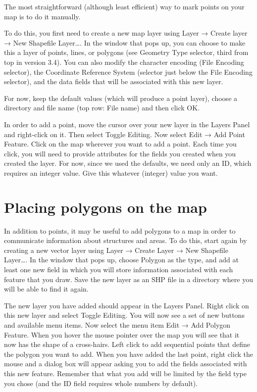 \documentclass[]{book}
\begin{document}
The most straightforward (although least efficient) way to mark points on your map is to do it manually.

To do this, you first need to create a new map layer using Layer → Create layer → New Shapefile Layer\ldots{}. In the window that pops up, you can choose to make this a layer of points, lines, or polygons (see Geometry Type selector, third from top in version 3.4). You can also modify the character encoding (File Encoding selector), the Coordinate Reference System (selector just below the File Encoding selector), and the data fields that will be associated with this new layer.

For now, keep the default values (which will produce a point layer), choose a directory and file name (top row: File name) and then click OK.

In order to add a point, move the cursor over your new layer in the Layers Panel and right-click on it. Then select Toggle Editing. Now select Edit → Add Point Feature. Click on the map wherever you want to add a point. Each time you click, you will need to provide attributes for the fields you created when you created the layer. For now, since we used the defaults, we need only an ID, which requires an integer value. Give this whatever (integer) value you want.

\hypertarget{placing-polygons-on-the-map}{%
\section{Placing polygons on the map}\label{placing-polygons-on-the-map}}

In addition to points, it may be useful to add polygons to a map in order to communicate information about structures and areas. To do this, start again by creating a new vector layer using Layer → Create Layer → New Shapefile Layer\ldots{}. In the window that pops up, choose Polygon as the type, and add at least one new field in which you will store information associated with each feature that you draw. Save the new layer as an SHP file in a directory where you will be able to find it again.

The new layer you have added should appear in the Layers Panel. Right click on this new layer and select Toggle Editing. You will now see a set of new buttons and available menu items. Now select the menu item Edit → Add Polygon Feature. When you hover the mouse pointer over the map you will see that it now has the shape of a cross-hairs. Left click to add sequential points that define the polygon you want to add. When you have added the last point, right click the mouse and a dialog box will appear asking you to add the fields associated with this new feature. Remember that what you add will be limited by the field type you chose (and the ID field requires whole numbers by default).
\end{document}
